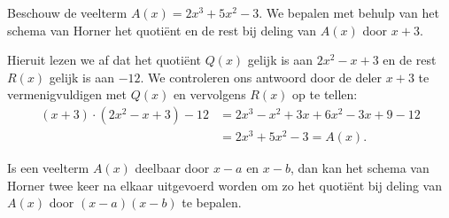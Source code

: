 \documentclass{ximera}
\begin{document}
\begin{example} 
Beschouw de veelterm $A(x) = 2x^3 + 5x^2 - 3$. We bepalen met behulp van het schema van Horner het quotiënt en de rest bij deling van $A(x)$ door $x+3$. 
\renewcommand{\kolbreed}{\widthof{$-3 \cdot (-1)$}}

Hieruit lezen we af dat het quotiënt $Q(x)$ gelijk is aan $2x^2-x+3$ en de rest $R(x)$ gelijk is aan $-12$. We controleren ons antwoord door de deler $x+3$ te vermenigvuldigen met $Q(x)$ en vervolgens $R(x)$ op te tellen:
\begin{align*}
(x+3)\cdot(2x^2-x+3) - 12 
& = 2x^3 - x^2 + 3x + 6x^2 - 3x + 9 - 12 \\
& = 2x^3 + 5x^2 - 3 = A(x).
\end{align*}
\end{example} 



Is een veelterm $A(x)$ deelbaar door $x-a$ en $x-b$, dan kan het schema van Horner twee keer na elkaar uitgevoerd worden om zo het quotiënt bij deling van $A(x)$ door $(x-a)(x-b)$ te bepalen. 
\end{document}
